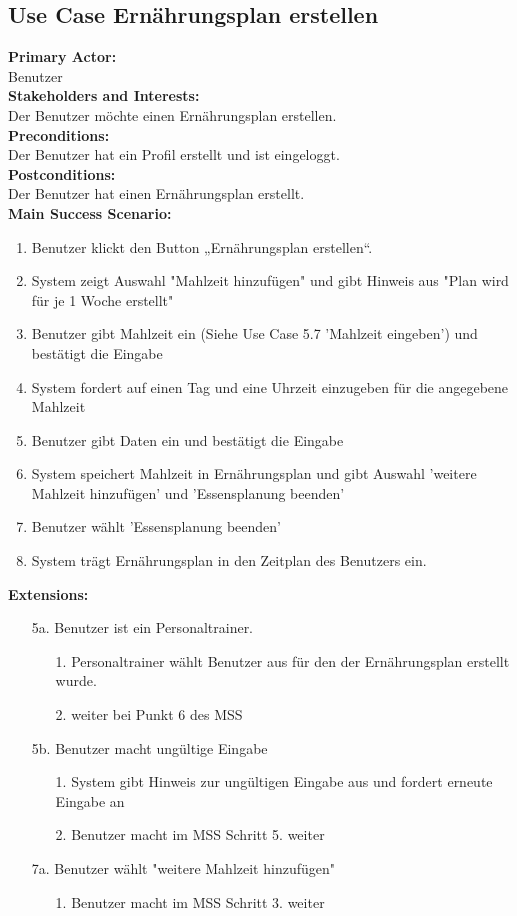 \documentclass[12pt,a4paper,onecolumn]{article}
\begin{document}
\subsection{Use Case Ernährungsplan erstellen}
\textbf{Primary Actor:}\\ Benutzer\\
\textbf{Stakeholders and Interests:}\\
Der Benutzer möchte einen Ernährungsplan erstellen.\\
\textbf{Preconditions:} \\ Der Benutzer hat ein Profil erstellt und ist eingeloggt.\\
\textbf{Postconditions:}\\Der Benutzer hat einen Ernährungsplan erstellt.\\
\textbf{Main Success Scenario:}
\begin{enumerate}
    \item Benutzer klickt den Button „Ernährungsplan erstellen“.
    \item System zeigt Auswahl "Mahlzeit hinzufügen" und gibt Hinweis aus "Plan wird für je 1 Woche erstellt" 
    \item Benutzer gibt Mahlzeit ein (Siehe Use Case 5.7 'Mahlzeit eingeben') und bestätigt die Eingabe
    \item System fordert auf einen Tag und eine Uhrzeit einzugeben für die angegebene Mahlzeit
    \item Benutzer gibt Daten ein und bestätigt die Eingabe
    \item System speichert Mahlzeit in Ernährungsplan und gibt Auswahl 'weitere Mahlzeit hinzufügen' und 'Essensplanung beenden'
    \item Benutzer wählt 'Essensplanung beenden'
    \item System trägt Ernährungsplan in den Zeitplan des Benutzers ein.
\end{enumerate}
\textbf{Extensions:}
\begin{enumerate}
    \item [5a.]  Benutzer ist ein Personaltrainer.
    \begin{enumerate}
        \item[1.]Personaltrainer wählt Benutzer aus für den der Ernährungsplan erstellt wurde.
        \item[2.] weiter bei Punkt 6 des MSS
    \end{enumerate}
    \item [5b.]Benutzer macht ungültige Eingabe
    \begin{enumerate}
        \item[1.]System gibt Hinweis zur ungültigen Eingabe aus und fordert erneute Eingabe an
        \item[2.]Benutzer macht im MSS Schritt 5. weiter
    \end{enumerate}
    \item[7a.] Benutzer wählt "weitere Mahlzeit hinzufügen"
    \begin{enumerate}
        \item [1.]Benutzer macht im MSS Schritt 3. weiter
    \end{enumerate}
\end{enumerate}
\end{document}
